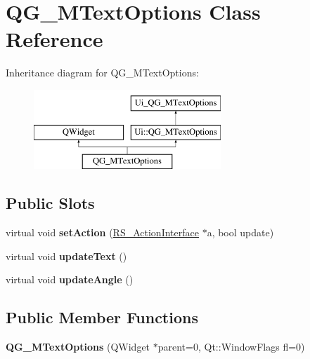\hypertarget{classQG__MTextOptions}{\section{Q\-G\-\_\-\-M\-Text\-Options Class Reference}
\label{classQG__MTextOptions}
}
Inheritance diagram for Q\-G\-\_\-\-M\-Text\-Options\-:\begin{figure}[H]
\begin{center}
\leavevmode
\includegraphics[height=3.000000cm]{classQG__MTextOptions}
\end{center}
\end{figure}
\subsection*{Public Slots}
\begin{DoxyCompactItemize}
\item 
\hypertarget{classQG__MTextOptions_aa7033716e2bea31e2b67aeeaf368af02}{virtual void {\bfseries set\-Action} (\hyperlink{classRS__ActionInterface}{R\-S\-\_\-\-Action\-Interface} $\ast$a, bool update)}\label{classQG__MTextOptions_aa7033716e2bea31e2b67aeeaf368af02}

\item 
\hypertarget{classQG__MTextOptions_afa512776ab02c6960681310202c7f5e0}{virtual void {\bfseries update\-Text} ()}\label{classQG__MTextOptions_afa512776ab02c6960681310202c7f5e0}

\item 
\hypertarget{classQG__MTextOptions_a6735c9998c13fff63e85103704d7d91a}{virtual void {\bfseries update\-Angle} ()}\label{classQG__MTextOptions_a6735c9998c13fff63e85103704d7d91a}

\end{DoxyCompactItemize}
\subsection*{Public Member Functions}
\begin{DoxyCompactItemize}
\item 
\hypertarget{classQG__MTextOptions_a47b2e91e639ca065dcd9a142fae96761}{{\bfseries Q\-G\-\_\-\-M\-Text\-Options} (Q\-Widget $\ast$parent=0, Qt\-::\-Window\-Flags fl=0)}\label{classQG__MTextOptions_a47b2e91e639ca065dcd9a142fae96761}

\end{DoxyCompactItemize}
